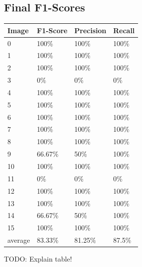 \documentclass[conference]{IEEEtran}
\begin{document}
\subsection{Final F1-Scores}
\begin{center}
	\begin{tabular}{| l | l | l | l |}
		\hline
		Image & F1-Score & Precision & Recall \\ \hline
		0 & 100\% & 100\% & 100\% \\ \hline
		1 & 100\% & 100\% & 100\% \\ \hline
		2 & 100\% & 100\% & 100\% \\ \hline
		3 &  0\% & 0\% & 0\% \\ \hline
		4 & 100\% & 100\% & 100\% \\ \hline
		5 & 100\% & 100\% & 100\% \\ \hline
		6 & 100\%  & 100\% & 100\% \\ \hline
		7 & 100\% & 100\% & 100\%\\ \hline
		8 & 100\% & 100\% & 100\% \\ \hline
		9 & 66.67\% & 50\% & 100\% \\ \hline
		10 & 100\% & 100\% & 100\% \\ \hline
		11 & 0\% & 0\% & 0\% \\ \hline
		12 & 100\% & 100\% & 100\% \\ \hline
		13 & 100\% & 100\% & 100\% \\ \hline
		14 & 66.67\% & 50\% & 100\% \\ \hline
		15 & 100\% & 100\% & 100\%\\ \hline
		average & 83.33\% & 81.25\% & 87.5\% \\ \hline
	\end{tabular}
\end{center}

TODO: Explain table!
\end{document}

